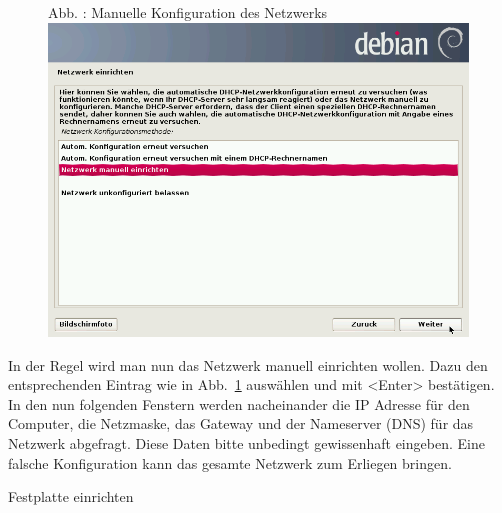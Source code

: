 \documentclass[a4paper,12pt,twoside]{article}
\newcounter{Abb}
\renewcommand\theAbb{\arabic{Abb}}
\begin{document}
\bigskip


\bigskip



\begin{figure}
\centering
\begin{minipage}{11.13cm}
Abb. {\theAbb\label{seq:refAbb6}}: Manuelle
Konfiguration des Netzwerks
\includegraphics[width=11.13cm,height=8.319cm]{efaLivede-img/efaLivede-img8.png}\end{minipage}
\end{figure}
In der Regel wird man nun das Netzwerk manuell einrichten wollen. Dazu
den entsprechenden Eintrag wie in Abb.~\ref{seq:refAbb6} auswählen und
mit {\textless}Enter{\textgreater} bestätigen. In den nun folgenden
Fenstern werden nacheinander die IP Adresse für den Computer, die
Netzmaske, das Gateway und der Nameserver (DNS) für das Netzwerk
abgefragt. Diese Daten bitte unbedingt gewissenhaft eingeben. Eine
falsche Konfiguration kann das gesamte Netzwerk zum Erliegen bringen.


\bigskip

Festplatte einrichten


\bigskip
\end{document}
